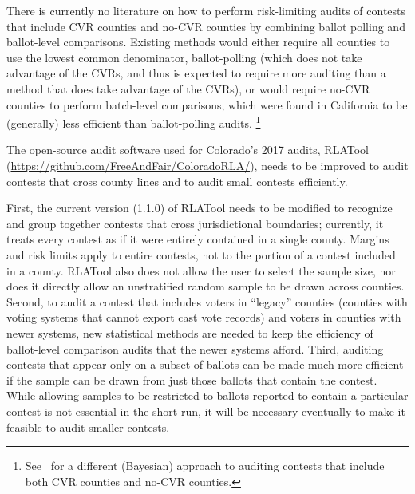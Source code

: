 \documentclass[12pt]{article}
\begin{document}
There is currently no literature on how to perform risk-limiting audits 
of contests that include CVR counties and no-CVR counties by combining
ballot polling and ballot-level comparisons.
Existing methods would either require all counties to use the lowest
common denominator, ballot-polling (which does not take advantage of the CVRs,
and thus is expected to require more auditing than a method that does take
advantage of the CVRs), or would
require no-CVR counties to perform batch-level comparisons, which were found in
California to be (generally) less efficient than ballot-polling audits.%
\footnote{%
  See~\cite{Rivest-2018-bayesian-tabulation-audits}
  for a different (Bayesian) approach to auditing contests that include both CVR counties
  and no-CVR counties.
  }

The open-source audit software used for Colorado's 2017 audits,
RLATool (\url{https://github.com/FreeAndFair/ColoradoRLA/}),
needs to be improved to audit
contests that cross county lines and to audit small contests efficiently.

First, the current version (1.1.0) of RLATool
needs to be modified to recognize and group together contests that cross jurisdictional
boundaries; currently, it treats every contest as if it were entirely
contained in a single county.
Margins and risk limits apply to entire contests, not to the portion of a contest
included in a county.
RLATool also does not allow the user to select the sample size, nor does
it directly allow an unstratified random sample to be drawn across counties.
Second, to audit a contest that includes voters in ``legacy'' counties
(counties with voting systems that cannot export cast vote records)
and voters in counties with newer systems, new statistical methods are needed to
keep the efficiency of ballot-level comparison audits that the newer systems
afford.
Third, auditing contests that appear only on a subset of ballots can
be made much more efficient if the sample can be drawn from just those ballots
that contain the contest.
While allowing samples to be restricted to ballots reported to contain a particular
contest is not essential in the short run, it will be necessary
eventually to make it feasible to audit smaller contests.
\end{document}

